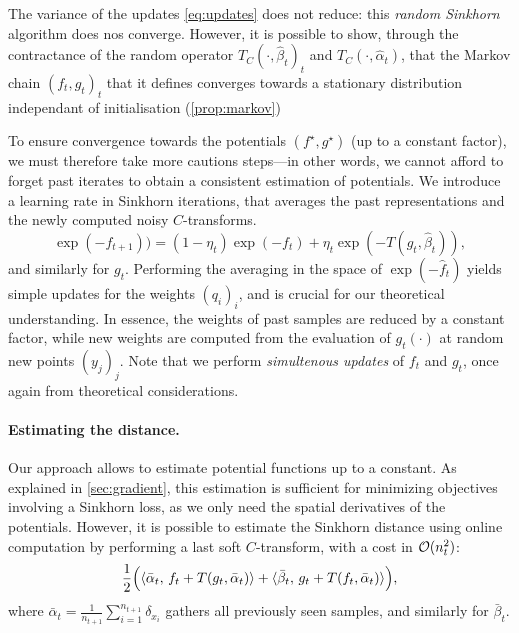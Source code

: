 The variance of the updates \eqref{eq:updates} does not reduce: this
\textit{random Sinkhorn} algorithm does nos converge. However, it is possible to
show, through the contractance of the random operator $T_C(\cdot, \hat
\beta_t)_t$ and $T_C(\cdot, \hat \alpha_t)$, that the Markov chain ${(f_t,
g_t)}_t$ that it defines converges towards a stationary distribution independant
of initialisation (\autoref{prop:markov})

To ensure convergence towards the potentials $(f^\star, g^\star)$ (up to a
constant factor), we must therefore take more cautions steps---in other words,
we cannot afford to forget past iterates to obtain a consistent estimation of
potentials. We introduce a learning rate in Sinkhorn iterations, that averages
the past representations and the newly computed noisy $C$-transforms.
\begin{equation}\label{eq:updates}
    \exp(-f_{t+1})
    ) = (1 - \eta_t) \exp(-f_t) 
    + \eta_t 
    \exp(-T(g_t, \hat \beta_t)),
\end{equation}
and similarly for $g_t$. Performing the averaging in the space of
$\exp(-\hat f_{t})$ yields simple updates for the weights
${(q_i)}_i$, and is crucial for our theoretical understanding. In essence, the
weights of past samples are reduced by a constant factor, while new weights are
computed from the evaluation of $g_t(\cdot)$ at random new points ${(y_j)}_j$. Note that we
perform \textit{simultenous updates} of $f_t$ and $g_t$, once again from
theoretical considerations.

\paragraph{Estimating the distance.} Our approach allows to estimate
potential functions up to a constant. As explained in \autoref{sec:gradient},
this estimation is sufficient for minimizing objectives involving a Sinkhorn loss, as we
only need the spatial derivatives of the potentials. 
However, it is possible to estimate the Sinkhorn distance using online computation by performing a last soft $C$-transform, with a cost in $\mathcal{O}(n_t^2)$:
\begin{equation}
    \frac{1}{2}\Big(\langle \bar \alpha_t,\,f_t + T(g_t, \bar \alpha_t)\rangle
     + \langle \bar \beta_t,\,g_t + T(f_t, \bar \alpha_t)\rangle\Big),
\end{equation}
where $\bar \alpha_t = \frac{1}{n_{t+1}}\sum_{i=1}^{n_{t+1}} \delta_{x_i}$
gathers all previously seen samples, and similarly for $\bar \beta_t$.

